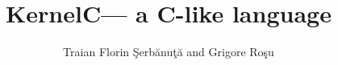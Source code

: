 
\newcommand{\KERNELC}{{\sc KernelC}\xspace}
\setlength{\parindent}{1em}
\title{\KERNELC --- a C-like language}
\author{Traian Florin \c{S}erb\u{a}nu\c{t}\u{a} and Grigore Ro\c{s}u}

\maketitle

